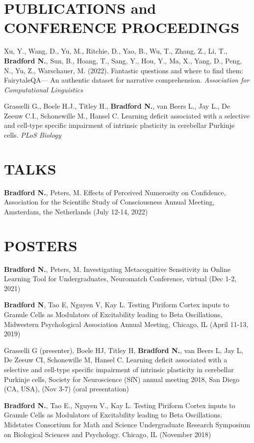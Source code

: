 \documentclass[margin, 10pt]{res} %
\begin{document}
\begin{resume}
\section{PUBLICATIONS and CONFERENCE PROCEEDINGS}
Xu, Y., Wang, D., Yu, M., Ritchie, D., Yao, B., Wu, T., Zhang, Z., Li, T., \textbf{Bradford N.}, Sun, B., Hoang, T., Sang, Y., Hou, Y., Ma, X., Yang, D., Peng, N., Yu, Z., Warschauer, M. (2022). Fantastic questions and where to find them: FairytaleQA— An authentic dataset for narrative comprehension. {\sl Association for Computational Linguistics}

Grasselli G., Boele H.J., Titley H., \textbf{Bradford N.}, van Beers L., Jay L., De Zeeuw C.I., Schonewille M., Hansel C. Learning deficit associated with a selective and cell-type specific impairment of intrinsic plasticity in cerebellar Purkinje cells.  {\sl PLoS Biology}

\section{TALKS}
\textbf{Bradford N.}, Peters, M. Effects of Perceived Numerosity on Confidence, Association for the Scientific Study of Consciousness Annual Meeting, Amsterdam, the Netherlands (July 12-14, 2022)

\section{POSTERS}
\textbf{Bradford N.}, Peters, M. Investigating Metacognitive Sensitivity in Online Learning Tool for Undergraduates, Neuromatch Conference, virtual (Dec 1-2, 2021)

\textbf{Bradford N}, Tao E, Nguyen V, Kay L. Testing Piriform Cortex inputs to Granule Cells as Modulators of Excitability leading to Beta Oscillations, Midwestern Psychological Association Annual Meeting, Chicago, IL (April 11-13, 2019)

Grasselli G (presenter), Boele HJ, Titley H, \textbf{Bradford N.}, van Beers L, Jay L, De Zeeuw CI, Schonewille M, Hansel C. Learning deficit associated with a selective and cell-type specific impairment of intrinsic plasticity in cerebellar Purkinje cells, Society for Neuroscience (SfN) annual meeting 2018, San Diego (CA, USA), (Nov 3-7) (oral presentation)

\textbf{Bradford N.}, Tao E., Nguyen V., Kay L. Testing Piriform Cortex inputs to Granule Cells as Modulators of Excitability leading to Beta Oscillations. Midstates Consortium for Math and Science Undergraduate Research Symposium on Biological Sciences and Psychology. Chicago, IL (November 2018) 


\end{resume}
\end{document}
